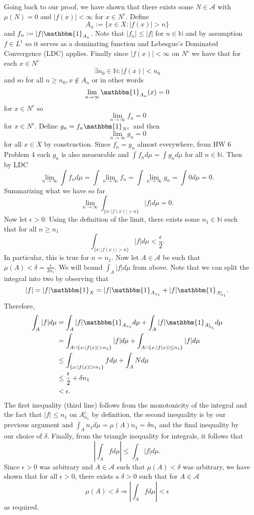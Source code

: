 \documentclass[12pt]{amsart} %
\def\N{\mathbb{N}}
\def\A{\mathcal{A}}
\def\1{\mathbbm{1}}
\begin{document}
Going back to our proof, we have shown that there exists some $N \in \A$ with $\mu(N) = 0$ and $|f(x)| < \infty$ for $x \in N^c$. Define $$A_n := \{x \in X: |f(x)| > n\}$$ and $f_n := |f|\1_{A_n}$. Note that $|f_n| \le  |f|$ for $n \in \N$ and by assumption $f \in L^1$ so it serves as a dominating function and Lebesgue's Dominated Convergence (LDC) applies. Finally since $|f(x)| < \infty$ on $N^c$ we have that for each  $x \in N^c$
$$\exists n_0 \in \N: |f(x)| < n_0$$ and so for all $n \ge n_0, x \notin A_n$ or in other words $$\lim_{n \to \infty} \1_{A_n}(x) = 0$$ for $x \in N^c$ so $$
\lim_{n \to \infty} f_n = 0$$ for $x \in N^c$. Define $g_n = f_n \1_{N^c}$ and then  $$\lim_{n \to \infty} g_n = 0$$ for all $x \in X$ by construction. Since $f_n = g_n$ almost everywhere, from HW 6 Problem 4 each $g_n$ is also measurable and $\int f_n d\mu  = \int g_n d\mu$  for all $n \in \N$. Then by LDC $$
\lim_{n \to \infty} \int f_n d\mu = \int \lim_{n \to \infty} f_n = \int \lim_{n \to \infty} g_n = \int 0 d\mu = 0.$$ Summarizing what we have so far $$
\lim_{n \to \infty} \int_{\{x: |f(x)| > n\}} |f| d\mu  = 0.$$ Now let $\epsilon > 0$. Using the definition of the limit, there exists some $n_1 \in \N$ such that for all $n \ge  n_1$ $$\int_{\{x: |f(x)| > n\}} |f| d\mu < \frac{\epsilon}{2}.$$ In particular, this is true for $n = n_1$. Now let  $A \in \A$ be such that $\mu(A) < \delta = \frac{\epsilon}{2n_1}$. We will bound $\int_A |f| d\mu$ from above. Note that we can split the integral into two by observing that $$|f| = |f|\1_{X} = |f|\1_{A_{n_1}} + |f|\1_{A_{n_1}^c}.$$ Therefore, 
\begin{align*}
\int_A |f| d\mu &= \int_A |f| \1_{A_{n_1}} d\mu	+ \int_A |f| \1_{A_{n_1}^c} d\mu \\
		&= \int_{A\cap \{x: |f(x)| > n_1\} } |f| d\mu	+ \int_{A\cap \{x: |f(x)| \le n_1\} } |f| d\mu	\\
		&\le  \int_{\{x: |f(x)| > n_1\}} f d\mu + \int_A N d\mu \\
		&\le \frac{\epsilon}{2} + \delta n_1 \\
		&< \epsilon. 
\end{align*}
The first inequality (third line) follows from the monotonicity of the integral and the fact that $|f| \le n_1$ on $A_{n_1}^c$ by definition, the second inequality is by our previous argument and $\int_A n_1 d\mu = \mu(A)n_1 = \delta n_1$ and the final inequality by our choice of $\delta$. Finally, from the triangle inequality for integrals, it follows that $$
\left|\int_A f d\mu\right| \le  \int_A |f|d\mu.
$$ Since $\epsilon>0$ was arbitrary and $A \in \A$ such that $\mu(A) < \delta$ was arbitrary, we have shown that for all $\epsilon > 0$, there exists a $\delta > 0$ such that for $A \in \A$ $$\mu(A) < \delta \Rightarrow \left|\int_A f d\mu\right| < \epsilon$$ as required. 
\end{document}
